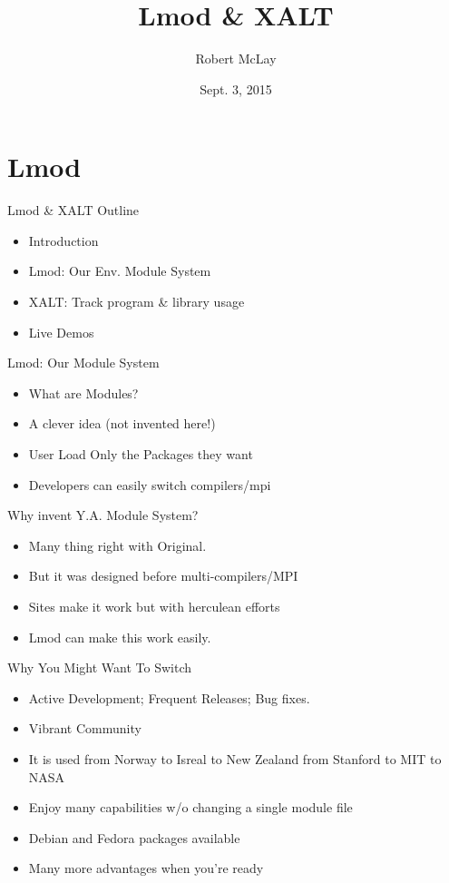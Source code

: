 \documentclass{beamer}
\title{Lmod \& XALT}
\author{Robert McLay}
\institute{The Texas Advanced Computing Center}
\date{Sept. 3, 2015}  %
\begin{document}
\begin{frame}
  \titlepage
\end{frame}

\section{Lmod}

\begin{frame}{Lmod \& XALT Outline}
  \begin{itemize}
    \item Introduction
    \item Lmod: Our Env. Module System
    \item XALT: Track program \& library usage
    \item Live Demos
  \end{itemize}
\end{frame}

\begin{frame}{Lmod: Our Module System}
  \begin{itemize}
    \item What are Modules?
    \item A clever idea (not invented here!)
    \item User Load Only the Packages they want
    \item Developers can easily switch compilers/mpi
  \end{itemize}
\end{frame}


\begin{frame}{Why invent Y.A. Module System?}
  \begin{itemize}
    \item Many thing right with Original.
    \item But it was designed before multi-compilers/MPI
    \item Sites make it work but with herculean efforts
    \item Lmod can make this work easily.
  \end{itemize}
\end{frame}


\begin{frame}{Why You Might Want To Switch}
  \begin{itemize}
    \item Active Development;  Frequent Releases; Bug fixes.
    \item Vibrant Community
    \item It is used from Norway to Isreal to New Zealand from Stanford to MIT to NASA
    \item Enjoy many capabilities w/o changing a single module file
    \item Debian and Fedora packages available
    \item Many more advantages when you're ready
  \end{itemize}
\end{frame}
\end{document}
